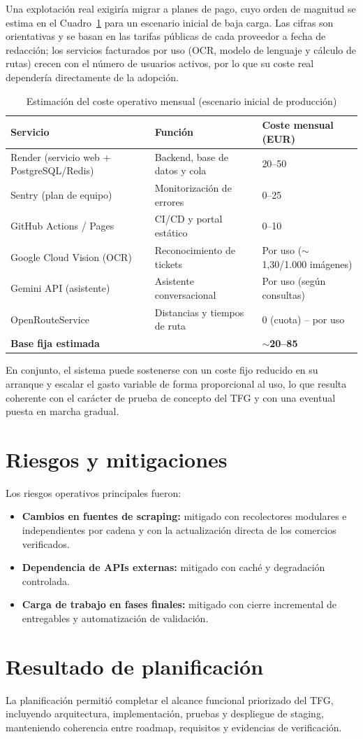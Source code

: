 Una explotaci\'on real exigir\'ia migrar a planes de pago, cuyo orden de magnitud se estima en el
Cuadro~\ref{tab:coste-operativo} para un escenario inicial de baja carga. Las cifras son
orientativas y se basan en las tarifas p\'ublicas de cada proveedor a fecha de redacci\'on; los
servicios facturados por uso (OCR, modelo de lenguaje y c\'alculo de rutas) crecen con el n\'umero
de usuarios activos, por lo que su coste real depender\'ia directamente de la adopci\'on.

\begin{table}[htbp]
\centering
\caption{Estimaci\'on del coste operativo mensual (escenario inicial de producci\'on)}
\label{tab:coste-operativo}
\small
\begin{tabular}{@{}lll@{}}
\toprule
\textbf{Servicio} & \textbf{Funci\'on} & \textbf{Coste mensual (EUR)} \\
\midrule
Render (servicio web + PostgreSQL/Redis) & Backend, base de datos y cola & 20--50 \\
Sentry (plan de equipo) & Monitorizaci\'on de errores & 0--25 \\
GitHub Actions / Pages & CI/CD y portal est\'atico & 0--10 \\
Google Cloud Vision (OCR) & Reconocimiento de tickets & Por uso ($\sim$1,30/1.000 im\'agenes) \\
Gemini API (asistente) & Asistente conversacional & Por uso (seg\'un consultas) \\
OpenRouteService & Distancias y tiempos de ruta & 0 (cuota) -- por uso \\
\midrule
\textbf{Base fija estimada} & & \textbf{$\sim$20--85} \\
\bottomrule
\end{tabular}
\end{table}

En conjunto, el sistema puede sostenerse con un coste fijo reducido en su arranque y escalar el
gasto variable de forma proporcional al uso, lo que resulta coherente con el car\'acter de prueba
de concepto del TFG y con una eventual puesta en marcha gradual.

\section{Riesgos y mitigaciones}

Los riesgos operativos principales fueron:

\begin{itemize}
	\item \textbf{Cambios en fuentes de scraping:} mitigado con recolectores modulares e
		independientes por cadena y con la actualizaci\'on directa de los comercios verificados.
	\item \textbf{Dependencia de APIs externas:} mitigado con cach\'e y degradaci\'on controlada.
	\item \textbf{Carga de trabajo en fases finales:} mitigado con cierre incremental de
		entregables y automatizaci\'on de validaci\'on.
\end{itemize}

\section{Resultado de planificaci\'on}

La planificaci\'on permiti\'o completar el alcance funcional priorizado del TFG,
incluyendo arquitectura, implementaci\'on, pruebas y despliegue de staging,
manteniendo coherencia entre roadmap, requisitos y evidencias de verificaci\'on.
